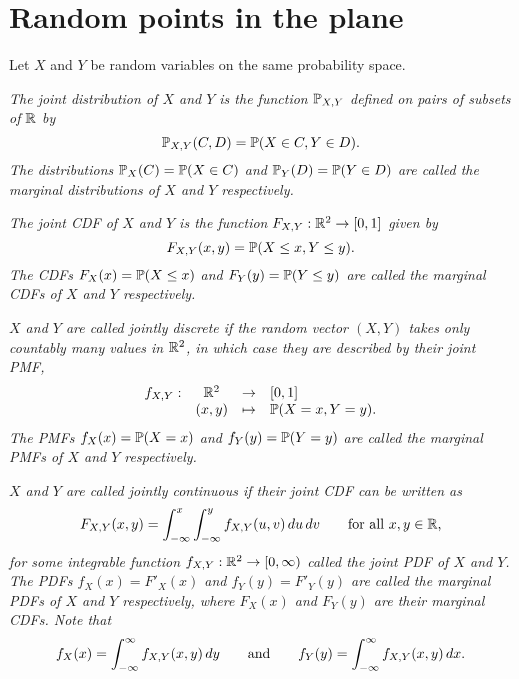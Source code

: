 
\section{Random points in the plane}\label{sec:joint}

Let $X$ and $Y$ be random variables on the same probability space.

\begin{definition}
\ben
\it The \emph{joint distribution} of $X$ and $Y$ is the function $\mathbb{P}_{X,Y}$ defined on pairs of subsets of $\mathbb{R}$ by
\[
\mathbb{P}_{X,Y}(C,D) = \mathbb{P}(X\in C, Y\in D).
\]
\it The distributions $\mathbb{P}_X(C)=\mathbb{P}(X\in C)$ and $\mathbb{P}_Y(D)=\mathbb{P}(Y\in D)$ are called the \emph{marginal distributions} of $X$ and $Y$ respectively.
\een
\end{definition}

\begin{definition}
\ben
\it The \emph{joint CDF} of $X$ and $Y$ is the function $F_{X,Y}:\mathbb{R}^2\to[0,1]$ given by
\[
F_{X,Y}(x,y) = \mathbb{P}(X\leq x,Y\leq y).
\]
\it The CDFs $F_X(x)=\mathbb{P}(X\leq x)$ and $F_Y(y)=\mathbb{P}(Y\leq y)$ are called the \emph{marginal CDFs} of $X$ and $Y$ respectively.
\een
\end{definition}

\begin{definition}
\ben
\it $X$ and $Y$ are called \emph{jointly discrete} if the random vector $(X,Y)$ takes only countably many values in $\mathbb{R}^2$, in which case they are described by their \emph{joint PMF},
\[
\begin{array}{cccl}
f_{X,Y}:	& \mathbb{R}^2	& \to		& [0,1] \\
			& (x,y)	& \mapsto	& \mathbb{P}(X=x,Y=y).
\end{array}
\]
\it The PMFs $f_X(x)=\mathbb{P}(X=x)$ and $f_Y(y)=\mathbb{P}(Y=y)$ are called the \emph{marginal PMFs} of $X$ and $Y$ respectively.
\een
\end{definition}

\begin{definition}
\ben
\it $X$ and $Y$ are called \emph{jointly continuous} if their joint CDF can be written as
\[
F_{X,Y}(x,y) = \int_{-\infty}^x\int_{-\infty}^y f_{X,Y}(u,v)\,du\,dv \text{\qquad for all $x,y\in\mathbb{R}$,}
\]
for some integrable function $f_{X,Y}:\mathbb{R}^2\to[0,\infty)$ called the \emph{joint PDF} of $X$ and $Y$. 
\it The PDFs $f_X(x)=F'_X(x)$ and $f_Y(y)=F'_Y(y)$ are called the \emph{marginal PDFs} of $X$ and $Y$ respectively, where $F_X(x)$ and $F_Y(y)$ are their marginal CDFs. Note that
\[
f_X(x) = \int_{-\infty}^{\infty}f_{X,Y}(x,y)\,dy
\text{\qquad and\qquad}
f_Y(y) = \int_{-\infty}^{\infty}f_{X,Y}(x,y)\,dx.
\]
\een

\end{definition}

